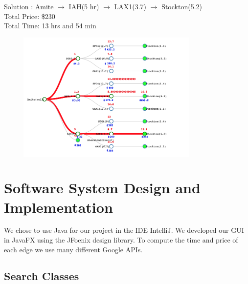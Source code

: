 \documentclass[11pt]{article}
\begin{document}
\pagebreak

\begin{center}
Solution : Amite $\rightarrow$ IAH(5 hr) $\rightarrow$ LAX1(3.7) $\rightarrow$ Stockton(5.2) \\
\quad Total Price: \$230 \\
\quad Total Time: 13 hrs and 54 min\\
\end{center}

\begin{figure}[!ht]
  \centering
  \includegraphics[width=0.8\textwidth]{time_lim}
  \label{fig:time_lim}
\end{figure}



\pagebreak

\section{Software System Design and Implementation}

We chose to use Java for our project in the IDE IntelliJ. We developed our GUI in JavaFX using the JFoenix design library.
To compute the time and price of each edge we use many different Google APIs. 

\subsection{Search Classes}
\end{document}
